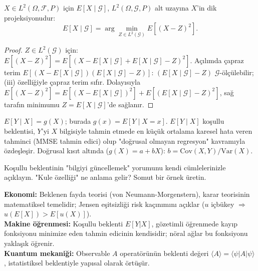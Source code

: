 \begin{onerme}
\label{prop:l2_projeksiyon}
$X \in L^2(\Omega, \mathcal{F}, P)$ için $E[X \mid \mathcal{G}]$,
$L^2(\Omega, \mathcal{G}, P)$ alt uzayına $X$'in dik projeksiyonudur:
\[
  E[X \mid \mathcal{G}] = \arg\min_{Z \in L^2(\mathcal{G})} E[(X - Z)^2].
\]
\end{onerme}

\begin{proof}
$Z \in L^2(\mathcal{G})$ için:
$E[(X-Z)^2] = E[(X - E[X\mid\mathcal{G}] + E[X\mid\mathcal{G}] - Z)^2]$.
Açılımda çapraz terim $E[(X - E[X\mid\mathcal{G}])(E[X\mid\mathcal{G}] - Z)]$:
$(E[X\mid\mathcal{G}] - Z)$ $\mathcal{G}$-ölçülebilir; (iii) özelliğiyle çapraz terim sıfır.
Dolayısıyla $E[(X-Z)^2] = E[(X-E[X\mid\mathcal{G}])^2] + E[(E[X\mid\mathcal{G}]-Z)^2]$,
sağ tarafın minimumu $Z = E[X \mid \mathcal{G}]$'de sağlanır.
\end{proof}

\begin{ornek}[Regresyon]
$E[Y \mid X] = g(X)$; burada $g(x) = E[Y \mid X = x]$.
$E[Y \mid X]$ koşullu beklentisi, $Y$'yi $X$ bilgisiyle tahmin etmede
en küçük ortalama karesel hata veren tahminci (MMSE tahmin edici) olup
"doğrusal olmayan regresyon" kavramıyla özdeşleşir.
Doğrusal kısıt altında ($g(X) = a + bX$): $b = \mathrm{Cov}(X,Y)/\mathrm{Var}(X)$.
\end{ornek}

\begin{kendinleifade}
Koşullu beklentinin "bilgiyi güncellemek" yorumunu kendi cümlelerinizle açıklayın.
"Kule özelliği" ne anlama gelir? Somut bir örnek üretin.
\end{kendinleifade}

\begin{kopru}
\textbf{Ekonomi:} Beklenen fayda teorisi (von Neumann-Morgenstern), karar teorisinin
matematiksel temelidir; Jensen eşitsizliği risk kaçınımını açıklar ($u$ içbükey $\Rightarrow$ $u(E[X]) > E[u(X)]$).\\
\textbf{Makine öğrenmesi:} Koşullu beklenti $E[Y|X]$, gözetimli öğrenmede kayıp fonksiyonu
minimize eden tahmin edicinin kendisidir; nöral ağlar bu fonksiyonu yaklaşık öğrenir.\\
\textbf{Kuantum mekaniği:} Observable $A$ operatörünün beklenti değeri $\langle A \rangle = \langle \psi | A | \psi \rangle$,
istatistiksel beklentiyle yapısal olarak örtüşür.
\end{kopru}

